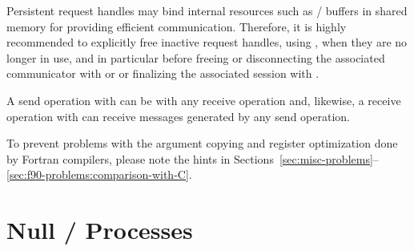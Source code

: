 \begin{users}
Persistent request handles may bind internal resources
such as \MPI/ buffers in shared memory for providing efficient communication.
Therefore, it is highly recommended to explicitly free inactive request handles,
using ,  when they are no longer in use,
and in particular before freeing or disconnecting the associated communicator
with  or 
or finalizing the associated session with .
\end{users}

A send operation 
with  can be  with
any receive operation and, likewise, a receive operation 
with  can receive messages generated by any send
operation.

\begin{users}
  To prevent problems with the argument copying and register optimization done
  by Fortran compilers, please note the hints in
Sections~\ref{sec:misc-problems}--\ref{sec:f90-problems:comparison-with-C}.
\end{users}

\section{Null \texorpdfstring{\MPI/}{MPI} Processes}
\label{sec:pt2pt-nullproc}

